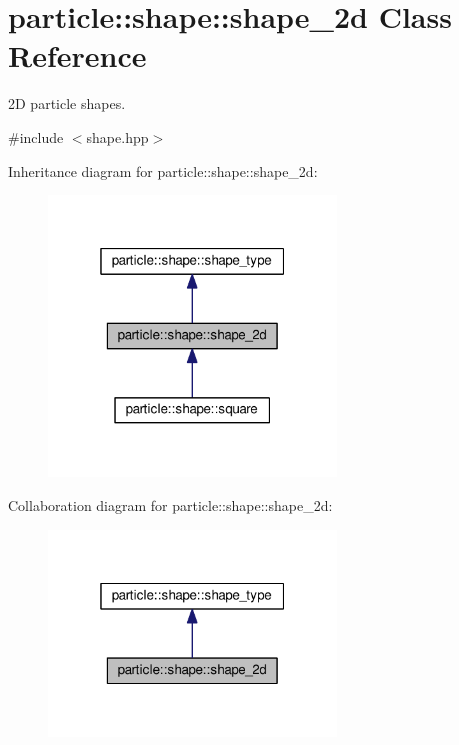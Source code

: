 \hypertarget{classparticle_1_1shape_1_1shape__2d}{}\section{particle\+:\+:shape\+:\+:shape\+\_\+2d Class Reference}
\label{classparticle_1_1shape_1_1shape__2d}


2D particle shapes.  




{\ttfamily \#include $<$shape.\+hpp$>$}



Inheritance diagram for particle\+:\+:shape\+:\+:shape\+\_\+2d\+:\nopagebreak
\begin{figure}[H]
\begin{center}
\leavevmode
\includegraphics[width=217pt]{db/d00/classparticle_1_1shape_1_1shape__2d__inherit__graph}
\end{center}
\end{figure}


Collaboration diagram for particle\+:\+:shape\+:\+:shape\+\_\+2d\+:\nopagebreak
\begin{figure}[H]
\begin{center}
\leavevmode
\includegraphics[width=217pt]{df/df8/classparticle_1_1shape_1_1shape__2d__coll__graph}
\end{center}
\end{figure}

